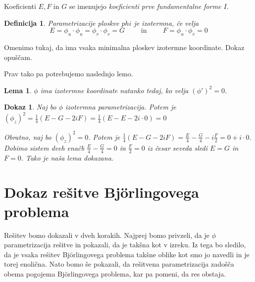 \documentclass{article}
\newtheorem{definicija}{Definicija}
\newtheorem{lema}{Lema}
\newtheorem{dokaz}{Dokaz}
\begin{document}
            Koeficienti $E, F \text{ in } G$ se imenujejo \emph{koeficienti prve fundamentalne forme $I$}.


            
            \begin{definicija}
                Parametrizacije ploskve $phi$ je \emph{izotermna}, če velja $$ E = \phi_u \cdot \phi_u = \phi_v 
                \cdot \phi_v = G \qquad \text{ in } \qquad F = \phi_u \cdot \phi_v = 0 $$ 
            \end{definicija}

            Omenimo tukaj, da ima vsaka minimalna ploskev izotermne koordinate. Dokaz opuščam.

            Prav tako pa potrebujemo naslednjo lemo.

            \begin{lema}
                $\phi$ ima izotermne koordinate natanko tedaj, ko velja $(\phi')^2 = 0$.
            \end{lema}

            \begin{dokaz}
                Naj bo $\phi$ izotermna parametrizacija. Potem je $\left( \phi_z \right)^2 = \frac{1}{4} \left( E - G - 2i F \right) 
                = \frac{1}{4} \left( E - E - 2i \cdot 0 \right) = 0$
            
                Obratno, naj bo $\left( \phi_z \right)^2 = 0$. Potem je $\frac{1}{4} \left( E - G - 2i F \right) = \frac{E}{4} - \frac{G}{4} - i \frac{F}{2} = 0 + i \cdot 0$.
                Dobimo sistem dveh enačb $\frac{E}{4} - \frac{G}{4} = 0$ in $\frac{F}{2} = 0$ iz česar seveda sledi $E = G$ in $F = 0$. Tako je naša lema dokazana.
            \end{dokaz}


    
    \section{Dokaz rešitve Björlingovega problema}

        Rešitev bomo dokazali v dveh korakih. Najprej bomo privzeli, da je $\phi$ parametrizacija rešitve in pokazali,
        da je takšna kot v izreku. Iz tega bo sledilo, da je vsaka rešitev Björlingovega problema takšne oblike 
        kot smo jo navedli in je torej enolična. Nato bomo še pokazali, da rešitvena parametrizacija zadošča 
        obema pogojema Björlingovega problema, kar pa pomeni, da res obstaja.
\end{document}
